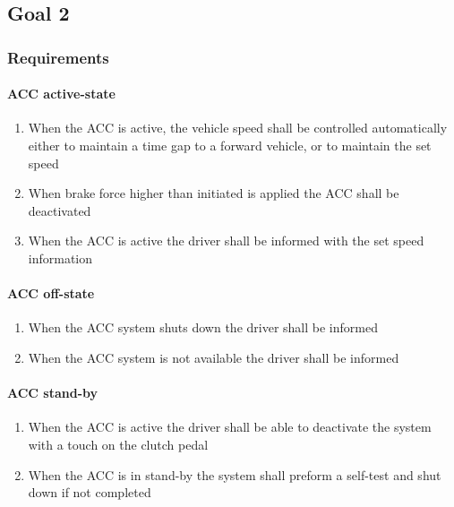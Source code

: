 \newpage
\subsection{Goal 2}

\subsubsection{Requirements}
\label{goal_2_requirements}

\paragraph{ACC active-state}
\begin{enumerate}
    \item When the ACC is active, the vehicle speed shall be controlled automatically either to maintain a time gap to a forward vehicle, or to maintain the set speed
    \item When brake force higher than initiated is applied the ACC shall be deactivated
    \item When the ACC is active the driver shall be informed with the set speed information
\end{enumerate}

\paragraph{ACC off-state}
\begin{enumerate}
    \item When the ACC system shuts down the driver shall be informed
    \item When the ACC system is not available the driver shall be informed
\end{enumerate}

\paragraph{ACC stand-by}
\begin{enumerate}
    \item When the ACC is active the driver shall be able to deactivate the system with a touch on the clutch pedal
    \item When the ACC is in stand-by the system shall preform a self-test and shut down if not completed
\end{enumerate}

